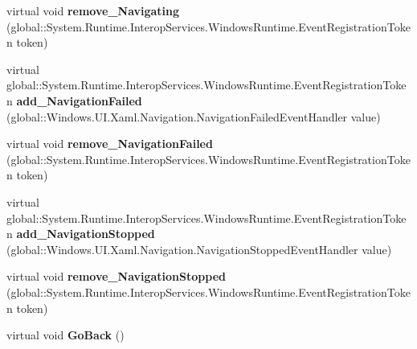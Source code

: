 \begin{DoxyCompactItemize}
\mbox{\label{class_windows_1_1_u_i_1_1_xaml_1_1_controls_1_1_frame_acc34f8b3bc84d17cad43aca5bcf5e0d4}} 
virtual void {\bfseries remove\+\_\+\+Navigating} (global\+::\+System.\+Runtime.\+Interop\+Services.\+Windows\+Runtime.\+Event\+Registration\+Token token)
\item 
\mbox{\label{class_windows_1_1_u_i_1_1_xaml_1_1_controls_1_1_frame_aa26741405bfc110f4b1b1905879092fd}} 
virtual global\+::\+System.\+Runtime.\+Interop\+Services.\+Windows\+Runtime.\+Event\+Registration\+Token {\bfseries add\+\_\+\+Navigation\+Failed} (global\+::\+Windows.\+U\+I.\+Xaml.\+Navigation.\+Navigation\+Failed\+Event\+Handler value)
\item 
\mbox{\label{class_windows_1_1_u_i_1_1_xaml_1_1_controls_1_1_frame_a5d519629c46865af9d6caf0f44a517fd}} 
virtual void {\bfseries remove\+\_\+\+Navigation\+Failed} (global\+::\+System.\+Runtime.\+Interop\+Services.\+Windows\+Runtime.\+Event\+Registration\+Token token)
\item 
\mbox{\label{class_windows_1_1_u_i_1_1_xaml_1_1_controls_1_1_frame_a6bf2da59d0a90e490aecaa3f355783ac}} 
virtual global\+::\+System.\+Runtime.\+Interop\+Services.\+Windows\+Runtime.\+Event\+Registration\+Token {\bfseries add\+\_\+\+Navigation\+Stopped} (global\+::\+Windows.\+U\+I.\+Xaml.\+Navigation.\+Navigation\+Stopped\+Event\+Handler value)
\item 
\mbox{\label{class_windows_1_1_u_i_1_1_xaml_1_1_controls_1_1_frame_a18e9954aafd2a9225401b40871f4f115}} 
virtual void {\bfseries remove\+\_\+\+Navigation\+Stopped} (global\+::\+System.\+Runtime.\+Interop\+Services.\+Windows\+Runtime.\+Event\+Registration\+Token token)
\item 
\mbox{\label{class_windows_1_1_u_i_1_1_xaml_1_1_controls_1_1_frame_aa208a306e405ff8aad9dc0a19d722b18}} 
virtual void {\bfseries Go\+Back} ()
\item 
\mbox{\label{class_windows_1_1_u_i_1_1_xaml_1_1_controls_1_1_frame_a77897d1c6e165763d79d0444353627b6}} 

\end{DoxyCompactItemize}
